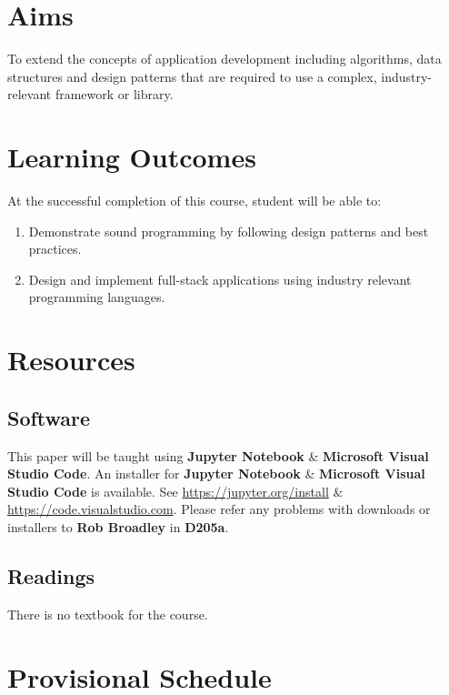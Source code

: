 \documentclass{article}
\begin{document}
\section*{Aims}
To extend the concepts of application development including algorithms, data structures and design patterns that are required to use a complex, industry-relevant framework or library.

\section*{Learning Outcomes}
At the successful completion of this course, student will be able to:
\begin{enumerate}
	\item Demonstrate sound programming by following design patterns and best practices.  
	\item Design and implement full-stack applications using industry relevant programming languages.
\end{enumerate}

\section*{Resources}

\subsection*{Software}
This paper will be taught using \textbf{Jupyter Notebook} \& \textbf{Microsoft Visual Studio Code}. An installer for \textbf{Jupyter Notebook} \& \textbf{Microsoft Visual Studio Code} is available. See \href{https://jupyter.org/install}{https://jupyter.org/install} \& \href{https://code.visualstudio.com}{https://code.visualstudio.com}. Please refer any problems with downloads or installers to \textbf{Rob Broadley} in \textbf{D205a}.

\subsection*{Readings}
There is no textbook for the course.

\section*{Provisional Schedule}
\end{document}

